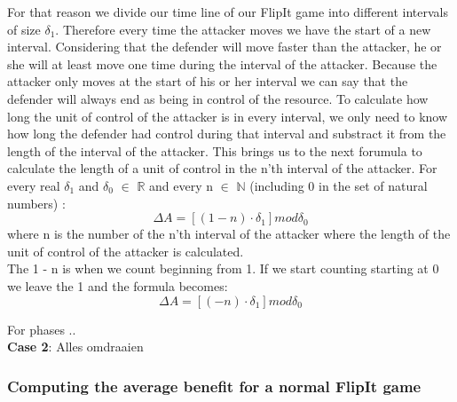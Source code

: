 For that reason we divide our time line of our FlipIt game into different intervals of size $\delta_{1}$. Therefore every time the attacker moves we have the start of a new interval. Considering that the defender will move faster than the attacker, he or she will at least move one time during the interval of the attacker. Because the attacker only moves at the start of his or her interval we can say that the defender will always end as being in control of the resource. To calculate how long the unit of control of the attacker is in every interval, we only need to know how long the defender had control during that interval and substract it from the length of the interval of the attacker. 
This brings us to the next forumula to calculate the length of a unit of control in the n'th interval of the attacker. 
For every real $\delta_{1}$ and $\delta_{0}$ $\in$ \(\mathbb{R}\) and every n $\in$ \(\mathbb{N}\) (including 0 in the set of natural numbers) :
\begin{equation}\label{first}
\Delta A = [( 1- n  ) \cdot \delta_{1}] mod \delta_{0}
\end{equation}
where n is the number of the n'th interval of the attacker where the length of the unit of control of the attacker is calculated.\\

The 1 - n is when we count beginning from 1. If we start counting starting at 0 we leave the 1 and the formula becomes:
\begin{equation}\label{first}
\Delta A = [( - n  ) \cdot \delta_{1}] mod \delta_{0}
\end{equation}


For phases .. \\

\textbf{Case 2}:
Alles omdraaien 
\subsubsection{Computing the average benefit for a normal FlipIt game}

